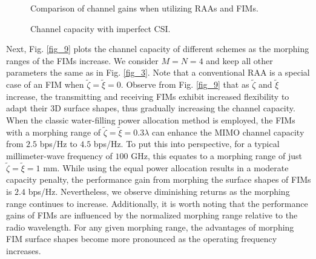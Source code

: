 \documentclass[lettersize,journal]{IEEEtran}
\begin{document}
\begin{figure}[!t]
\centering
{}
\caption{Comparison of channel gains when utilizing RAAs and FIMs.}
\label{fig_10}
\end{figure}

\begin{figure}[!t]
\centering
{}
\caption{Channel capacity with imperfect CSI.}\vspace{-0.5cm}
\label{fig_10A}
\end{figure}
Next, Fig. \ref{fig_9} plots the channel capacity of different schemes as the morphing ranges of the FIMs increase. We consider $M = N = 4$ and keep all other parameters the same as in Fig. \ref{fig_3}. Note that a conventional RAA is a special case of an FIM when $\tilde \zeta = \tilde \xi = 0$. Observe from Fig. \ref{fig_9} that as $\tilde \zeta $ and $\tilde \xi$ increase, the transmitting and receiving FIMs exhibit increased flexibility to adapt their 3D surface shapes, thus gradually increasing the channel capacity. When the classic water-filling power allocation method is employed, the FIMs with a morphing range of $\tilde \zeta = \tilde \xi = 0.3\lambda$ can enhance the MIMO channel capacity from $2.5$ bps/Hz to $4.5$ bps/Hz. To put this into perspective, for a typical millimeter-wave frequency of $100$ GHz, this equates to a morphing range of just $\tilde \zeta = \tilde \xi = 1$ mm. While using the equal power allocation results in a moderate capacity penalty, the performance gain from morphing the surface shapes of FIMs is $2.4$ bps/Hz. Nevertheless, we observe diminishing returns as the morphing range continues to increase. Additionally, it is worth noting that the performance gains of FIMs are influenced by the normalized morphing range relative to the radio wavelength. For any given morphing range, the advantages of morphing FIM surface shapes become more pronounced as the operating frequency increases.
\end{document}
